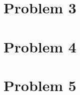 \documentclass[a4paper]{article}
\begin{document}
\section{Problem 3}

\subsection{}

\subsection{}

\subsection{}

\subsection{}

\section{Problem 4}


\section{Problem 5}

\subsection{}

\subsection{}
\end{document}

